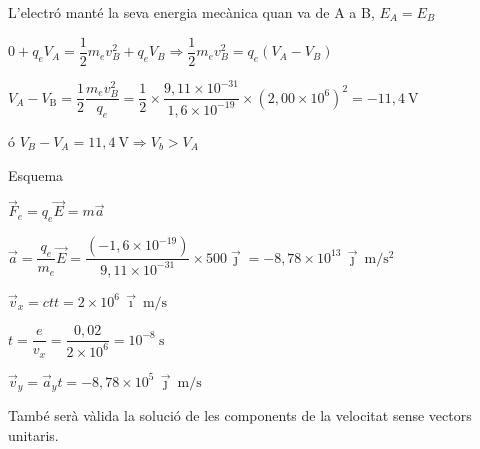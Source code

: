 \begin{solapartat}
L'electró manté la seva energia mecànica quan va de A a B, $E_A = E_B$

 $0 + q_eV_A = \dfrac{1}{2}m_ev_B^2 + q_eV_B \Rightarrow \dfrac{1}{2}m_ev_B^2 = q_e(V_A - V_B)$

 $V_A - V_\mathrm{B} = \dfrac{1}{2}\dfrac{m_ev_B^2}{q_e} = \dfrac{1}{2}\times\dfrac{9,11\times 10^{-31}}{1,6\times 10^{-19}}\times(2,00\times 10^{6})^2 = -11,4\ \mathrm{V}$

ó \quad $V_B - V_A = 11,4\ \mathrm{V} \Rightarrow V_b > V_A$

 Esquema
\end{solapartat}

\begin{solapartat}
\begin{minipage}[t]{0.6\linewidth}
 $\vec{F}_e = q_e\vec{E} = m\vec{a}$

 $\vec{a} = \dfrac{q_e}{m_e}\vec{E} = \dfrac{(-1,6\times 10^{-19})}{9,11\times 10^{-31}}\times 500\vec{\jmath} = -8,78\times 10^{13}\,\vec{\jmath}\ \mathrm{m/s^2}$

 $\vec{v}_x = ctt = 2\times 10^{6}\,\vec{\imath}\ \mathrm{m/s}$

 $t = \dfrac{e}{v_x} = \dfrac{0,02}{2\times 10^{6}} = 10^{-8}\ \mathrm{s}$

 $\vec{v}_y = \vec{a}_yt = -8,78\times 10^{5}\,\vec{\jmath}\ \mathrm{m/s}$
\end{minipage}\hfill
\begin{minipage}[t]{0.36\linewidth}
\vspace{0pt}
\end{minipage}

\medskip
També serà vàlida la solució de les components de la velocitat sense vectors unitaris.
\end{solapartat}
